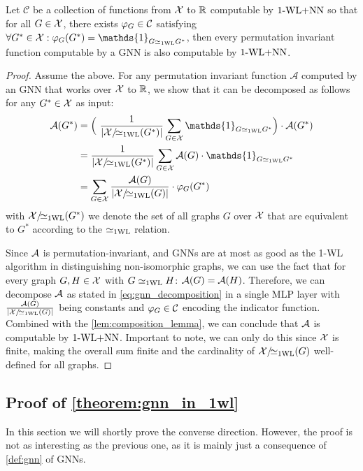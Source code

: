 \begin{lemma}\label{lem:decompose_gnn_as_wl}
    Let $\mathcal{C}$ be a collection of functions from $\mathcal{X}$ to $\mathbb{R}$ computable by $\text{1-WL+NN}$ so that for all $G \in \mathcal{X}$, there exists 
    $\varphi_G \in \mathcal{C}$ satisfying $\forall G^* \in \cX: \varphi_G(G^*) = \mathds{1}_{G \wliso G^*}$, then every permutation invariant function computable by a GNN is also computable by $\text{1-WL+NN}$.
\end{lemma}

\begin{proof}
    Assume the above. For any permutation invariant function $\mathcal{A}$ computed by an GNN that works over $\mathcal{X}$ to $\mathbb{R}$, we show that it can be decomposed as follows for any $G^* \in \mathcal{X}$ as input:
    \begin{align}\label{eq:gnn_decomposition}
        \mathcal{A}(G^*) &= \Bigl( \ \frac{1}{|\cX/\!{\wliso}(G^*)|}\sum_{G \in \cX} \mathds{1}_{G \wliso G^*} \Bigr) \cdot \mathcal{A}(G^*) \nonumber \\
        &= \frac{1}{|\cX/\!{\wliso}(G^*)|}\sum_{G \in \cX} \mathcal{A}(G) \cdot \mathds{1}_{G \wliso G^*} \nonumber \\
        &= \sum_{G \in \cX} \frac{\mathcal{A}(G)}{|\cX/\!{\wliso}(G)|}  \cdot \varphi_G(G^*)
    \end{align}
    with $\mathcal{X}/\!{\simeq_{\text{1WL}}}(G^*)$ we denote the set of all graphs $G$ over $\mathcal{X}$ that are equivalent to $G^*$ according to the $\simeq_{\text{1WL}}$ relation.

    Since $\mathcal{A}$ is permutation-invariant, and GNNs are at most as good as the 1-WL algorithm in distinguishing non-isomorphic graphs, we can use the fact that for every graph $G,H \in \mathcal{X}$ with $G \simeq_{\text{1WL}} H$: $\mathcal{A}(G) = \mathcal{A}(H)$. Therefore, we can decompose $\mathcal{A}$ as stated in \autoref{eq:gnn_decomposition} in a single MLP layer with $\frac{\mathcal{A}(G)}{|\mathcal{X}/\!{\simeq_{\text{1WL}}}(G)|}$ being constants and $\varphi_G \in \mathcal{C}$ encoding the indicator function. Combined with the \cref{lem:composition_lemma}, we can conclude that $\mathcal{A}$ is computable by $\text{1-WL+NN}$. Important to note, we can only do this since $\mathcal{X}$ is finite, making the overall sum finite and the cardinality of $\mathcal{X}/\!{\simeq_{\text{1WL}}}(G)$ well-defined for all graphs.
\end{proof}

\subsection{Proof of \cref{theorem:gnn_in_1wl}}
In this section we will shortly prove the converse direction. However, the proof is not as interesting as the previous one, as it is mainly just a consequence of \cref{def:gnn} of GNNs.


